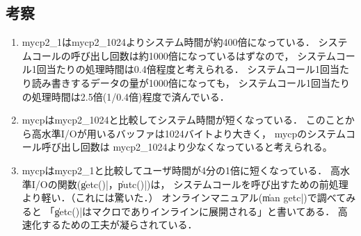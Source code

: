 \documentclass[a4j,twcolumn,11pt,nomag]{ltjarticle}      %
\begin{document}
\subsection*{考察}
\begin{enumerate}
  \item mycp2\_1はmycp2\_1024よりシステム時間が約400倍になっている．
   システムコールの呼び出し回数は約1000倍になっているはずなので，
   システムコール1回当たりの処理時間は0.4倍程度と考えられる．
   システムコール1回当たり読み書きするデータの量が1000倍になっても，
   システムコール1回当たりの処理時間は2.5倍(1/0.4倍)程度で済んでいる．
  \item mycpはmycp2\_1024と比較してシステム時間が短くなっている．
   このことから高水準I/Oが用いるバッファは1024バイトより大きく，
   mycpのシステムコール呼び出し回数は
   mycp2\_1024より少なくなっていると考えられる。
  \item mycpはmycp2\_1と比較してユーザ時間が4分の1倍に短くなっている．
   高水準I/Oの関数(\|getc()|，\|putc()|)は，
   システムコールを呼び出すための前処理より軽い．（これには驚いた．）
   オンラインマニュアル(\|man getc|)で調べてみると
   「\|getc()|はマクロでありインラインに展開される」と書いてある．
   高速化するための工夫が凝らされている．
\end{enumerate}
\end{document}
